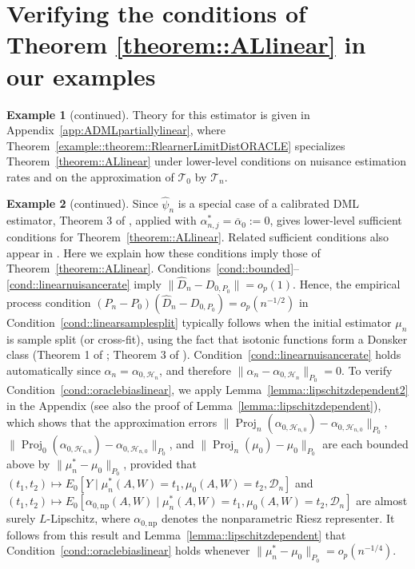 \documentclass[11pt]{article}
\theoremstyle{definition}
\newtheorem{example}{Example}
\begin{document}
\section{Verifying the conditions of Theorem \ref{theorem::ALlinear} in our examples}
\label{appendix::conditionsexamples}


\setcounter{example}{1}

\begin{example}[continued]
    
 
Theory for this estimator is given in Appendix~\ref{app:ADMLpartiallylinear}, where Theorem~\ref{example::theorem::RlearnerLimitDistORACLE} specializes Theorem~\ref{theorem::ALlinear} under lower-level conditions on nuisance estimation rates and on the approximation of \(\mathcal{T}_0\) by \(\mathcal{T}_n\).
\end{example}


\begin{example}[continued]

Since \(\widehat{\psi}_n\) is a special case of a calibrated DML estimator, Theorem 3 of \cite{van2024automatic}, applied with \(\alpha_{n,j}^* = \overline{\alpha}_0 := 0\), gives lower-level sufficient conditions for Theorem~\ref{theorem::ALlinear}. Related sufficient conditions also appear in \cite{ATEsupereff}. Here we explain how these conditions imply those of Theorem~\ref{theorem::ALlinear}. Conditions~\ref{cond::bounded}--\ref{cond::linearnuisancerate} imply \(\|\widehat{D}_n - D_{0,P_0}\| = o_p(1)\). Hence, the empirical process condition \((P_n - P_0)(\widehat{D}_n - D_{0,P_0}) = o_p(n^{-1/2})\) in Condition~\ref{cond::linearsamplesplit} typically follows when the initial estimator \(\mu_n\) is sample split (or cross-fit), using the fact that isotonic functions form a Donsker class (Theorem 1 of \citealp{rabenseifner2025calibration}; Theorem 3 of \cite{van2024automatic}). Condition~\ref{cond::linearnuisancerate} holds automatically since \(\alpha_n = \alpha_{0,\mathcal{H}_n}\), and therefore \(\|\alpha_n - \alpha_{0,\mathcal{H}_n}\|_{P_0} = 0\). To verify Condition~\ref{cond::oraclebiaslinear}, we apply Lemma~\ref{lemma::lipschitzdependent2} in the Appendix (see also the proof of Lemma~\ref{lemma::lipschitzdependent}), which shows that the approximation errors \(\|\operatorname{Proj}_n(\alpha_{0,\mathcal{H}_{n,0}})-\alpha_{0,\mathcal{H}_{n,0}}\|_{P_0}\), \(\|\operatorname{Proj}_0(\alpha_{0,\mathcal{H}_{n,0}})-\alpha_{0,\mathcal{H}_{n,0}}\|_{P_0}\), and \(\|\operatorname{Proj}_n(\mu_0)-\mu_0\|_{P_0}\) are each bounded above by \(\|\mu_n^*-\mu_0\|_{P_0}\), provided that \((t_1,t_2)\mapsto E_0[Y \mid \mu_n^*(A,W)=t_1,\mu_0(A,W)=t_2,\mathcal{D}_n]\) and \((t_1,t_2)\mapsto E_0[\alpha_{0,\mathrm{np}}(A,W)\mid \mu_n^*(A,W)=t_1,\mu_0(A,W)=t_2,\mathcal{D}_n]\) are almost surely \(L\)-Lipschitz, where \(\alpha_{0,\mathrm{np}}\) denotes the nonparametric Riesz representer. It follows from this result and Lemma~\ref{lemma::lipschitzdependent} that Condition~\ref{cond::oraclebiaslinear} holds whenever \(\|\mu_n^*-\mu_0\|_{P_0}=o_p(n^{-1/4})\). 
\end{example}
\end{document}
